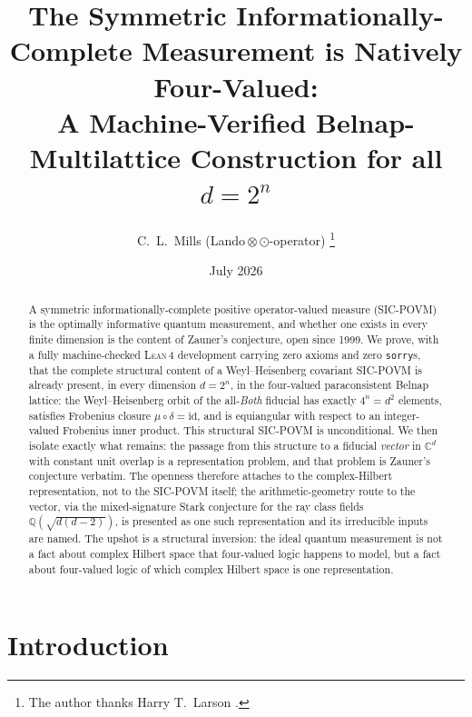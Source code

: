 \documentclass[12pt,a4paper]{article}
\newcommand{\frob}{\mu \circ \delta = \mathrm{id}}
\newcommand{\Lean}{\textsc{Lean\,4}}
\begin{document}
\title{\textbf{The Symmetric Informationally-Complete Measurement is
Natively Four-Valued:\\
A Machine-Verified Belnap-Multilattice Construction for all $d = 2^n$}}

\author{C.\ L.\ Mills (Lando\,$\otimes$\,$\odot$-operator)%
\thanks{The author thanks Harry T.\ Larson \cite{Larson1961}.}}

\date{July 2026}

\maketitle

\begin{abstract}
A symmetric informationally-complete positive operator-valued measure
(SIC-POVM) is the optimally informative quantum measurement, and whether one
exists in every finite dimension is the content of Zauner's conjecture, open
since 1999. We prove, with a fully machine-checked \Lean{} development
carrying zero axioms and zero \texttt{sorry}s, that the complete structural
content of a Weyl--Heisenberg covariant SIC-POVM is already present, in every
dimension $d = 2^n$, in the four-valued paraconsistent Belnap lattice: the
Weyl--Heisenberg orbit of the all-\emph{Both} fiducial has exactly $4^n = d^2$
elements, satisfies Frobenius closure $\frob$, and is equiangular with respect
to an integer-valued Frobenius inner product. This structural SIC-POVM is
unconditional. We then isolate exactly what remains: the passage from this
structure to a fiducial \emph{vector} in $\mathbb{C}^d$ with constant unit
overlap is a representation problem, and that problem is Zauner's conjecture
verbatim. The openness therefore attaches to the complex-Hilbert
representation, not to the SIC-POVM itself; the arithmetic-geometry route to
the vector, via the mixed-signature Stark conjecture for the ray class fields
$\mathbb{Q}(\sqrt{d(d-2)})$, is presented as one such representation and its
irreducible inputs are named. The upshot is a structural inversion: the ideal
quantum measurement is not a fact about complex Hilbert space that four-valued
logic happens to model, but a fact about four-valued logic of which complex
Hilbert space is one representation.
\end{abstract}

\tableofcontents
\newpage

\section{Introduction}
\end{document}

